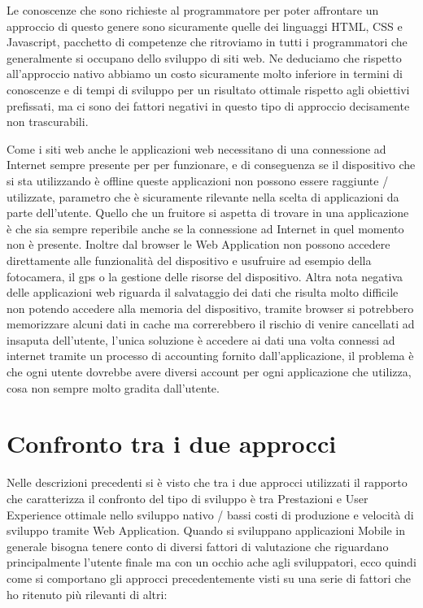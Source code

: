 Le conoscenze che sono richieste al programmatore per poter affrontare un approccio di questo genere sono sicuramente quelle dei linguaggi HTML, CSS e Javascript, pacchetto di competenze che ritroviamo in tutti i programmatori che generalmente si occupano dello sviluppo di siti web. Ne deduciamo che rispetto all'approccio nativo abbiamo un costo sicuramente molto inferiore in termini di conoscenze e di tempi di sviluppo per un risultato ottimale rispetto agli obiettivi prefissati, ma ci sono dei fattori negativi in questo tipo di approccio decisamente non trascurabili.

Come i siti web anche le applicazioni web necessitano di una connessione ad Internet sempre presente per per funzionare, e di conseguenza se il dispositivo che si sta utilizzando è offline queste applicazioni non possono essere raggiunte / utilizzate, parametro che è sicuramente rilevante nella scelta di applicazioni da parte dell'utente. Quello che un fruitore si aspetta di trovare in una applicazione è che sia sempre reperibile anche se la connessione ad Internet in quel momento non è presente. Inoltre dal browser le	 Web Application non possono accedere direttamente alle funzionalità del dispositivo e usufruire ad esempio della fotocamera, il gps o la gestione delle risorse del dispositivo. Altra nota negativa delle applicazioni web riguarda il salvataggio dei dati che risulta molto difficile non potendo accedere alla memoria del dispositivo, tramite browser si potrebbero memorizzare alcuni dati in cache ma correrebbero il rischio di venire cancellati ad insaputa dell'utente, l'unica soluzione è accedere ai dati una volta connessi ad internet tramite un processo di accounting fornito dall'applicazione, il problema è che ogni utente dovrebbe avere diversi account per ogni applicazione che utilizza, cosa non sempre molto gradita dall'utente.

\section{Confronto tra i due approcci}

Nelle descrizioni precedenti si è visto che tra i due approcci utilizzati il rapporto che caratterizza il confronto del tipo di sviluppo è tra Prestazioni e User Experience ottimale nello sviluppo nativo / bassi costi di produzione e velocità di sviluppo tramite Web Application. Quando si sviluppano applicazioni Mobile in generale bisogna tenere conto di diversi fattori di valutazione che riguardano principalmente l'utente finale ma con un occhio ache agli sviluppatori, ecco quindi come si comportano gli approcci precedentemente visti su una serie di fattori che ho ritenuto più rilevanti di altri:

